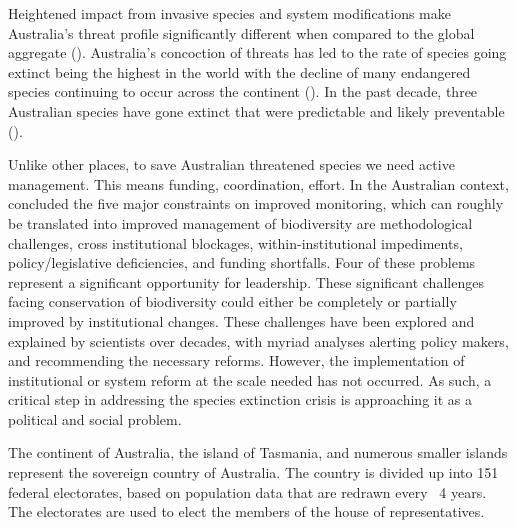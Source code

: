\documentclass[a4paper,11pt]{article}
\begin{document}
Heightened impact from invasive species and system modifications make Australia's threat profile significantly different when compared to the global aggregate (\cite{kearneyThreatsAustraliaImperilled2019}). Australia's concoction of threats has led to the rate of species going extinct being the highest in the world with the decline of many endangered species continuing to occur across the continent (\cite{simmondsVulnerableSpeciesEcosystems2020}). In the past decade, three Australian species have gone extinct that were predictable and likely preventable (\cite{woinarskiContributionPolicyLaw2017}).

Unlike other places, to save Australian threatened species we need active management. This means funding, coordination, effort. 
In the Australian context, \cite{leggeMonitoringThreatenedSpecies2018} concluded the five major constraints on improved monitoring, which can roughly be translated into improved management of biodiversity are methodological challenges, cross institutional blockages, within-institutional impediments, policy/legislative deficiencies, and funding shortfalls. 
Four of these problems represent a significant opportunity for leadership. 
These significant challenges facing conservation of biodiversity could either be completely or partially improved by institutional changes. These challenges have been explored and explained by scientists over decades, with myriad analyses alerting policy makers, and recommending the necessary reforms. However, the implementation of institutional or system reform at the scale needed has not occurred. As such, a critical step in addressing the species extinction crisis is approaching it as a political and social problem.

The continent of Australia, the island of Tasmania, and numerous smaller islands represent the sovereign country of Australia. The country is divided up into 151 federal electorates, based on population data that are redrawn every ~4 years. The electorates are used to elect the members of the house of representatives.
\end{document}
